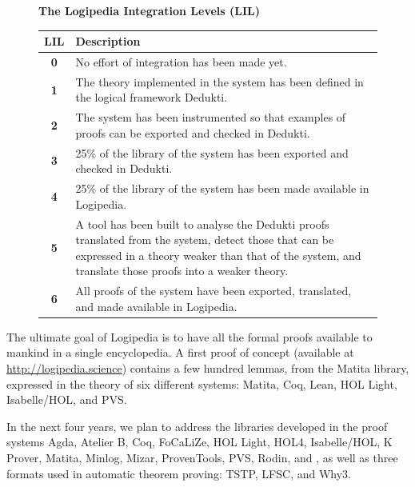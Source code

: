 \begin{figure}[ht]
\begin{shaded}
\begin{center}
{\bf \Large The Logipedia Integration Levels (LIL)\label{lil}}
\end{center}

\begin{longtable*}{|c|p{0.9\textwidth}|}
\hline
{\bf LIL} & {\bf Description}\\
\hline
{\bf 0} & No effort of integration has been made yet.\\
\hline
{\bf 1} & The theory implemented in the system has been defined in
the logical framework Dedukti.\\
\hline
{\bf 2} & The system has been instrumented so that examples of proofs
can be exported and checked in Dedukti.\\
\hline
{\bf 3} & 25\% of the library of the system has been
exported and checked in Dedukti.\\
\hline
{\bf 4} & 25\% of the library of the system has
been made available in Logipedia.\\
\hline
{\bf 5} & A tool has been built to analyse the Dedukti proofs
translated from the system, detect those that can be expressed in a theory
weaker than that of the system, and translate those proofs into a
weaker theory.\\
\hline
{\bf 6} & All proofs of the system have been exported, translated,
and made available in Logipedia.\\
\hline
\end{longtable*}
\end{shaded}
\end{figure}

The ultimate goal of Logipedia is to have all the formal proofs
available to mankind in a single encyclopedia.  A first proof of
concept (available at \url{http://logipedia.science}) contains a few hundred
lemmas, from the Matita library, expressed in the theory of six
different systems: Matita, Coq, Lean, HOL Light, Isabelle/HOL, and
PVS.

In the next four years, we plan to address
the libraries developed in the proof systems Agda, Atelier B, Coq, FoCaLiZe, HOL Light, HOL4,
Isabelle/HOL, K Prover, Matita, Minlog, Mizar, ProvenTools, PVS,
Rodin, and \tlaplus, as well as three formats used in automatic
theorem proving: TSTP, LFSC, and Why3. 

